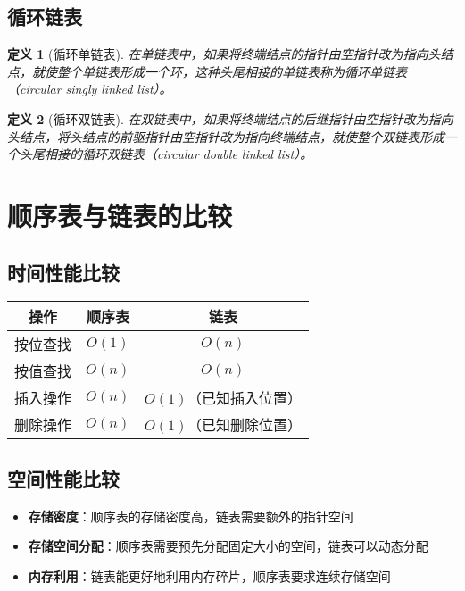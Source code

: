\documentclass[12pt,a4paper]{amsart}
\newtheorem{definition}{定义}[section]
\begin{document}
\subsection{循环链表}

\begin{definition}[循环单链表]
在单链表中，如果将终端结点的指针由空指针改为指向头结点，就使整个单链表形成一个环，这种头尾相接的单链表称为循环单链表（circular singly linked list）。
\end{definition}

\begin{definition}[循环双链表]
在双链表中，如果将终端结点的后继指针由空指针改为指向头结点，将头结点的前驱指针由空指针改为指向终端结点，就使整个双链表形成一个头尾相接的循环双链表（circular double linked list）。
\end{definition}

\section{顺序表与链表的比较}

\subsection{时间性能比较}

\begin{center}
\begin{tabular}{|c|c|c|}
\hline
\textbf{操作} & \textbf{顺序表} & \textbf{链表} \\
\hline
按位查找 & $O(1)$ & $O(n)$ \\
\hline
按值查找 & $O(n)$ & $O(n)$ \\
\hline
插入操作 & $O(n)$ & $O(1)$（已知插入位置） \\
\hline
删除操作 & $O(n)$ & $O(1)$（已知删除位置） \\
\hline
\end{tabular}
\end{center}

\subsection{空间性能比较}

\begin{itemize}
\item \textbf{存储密度}：顺序表的存储密度高，链表需要额外的指针空间
\item \textbf{存储空间分配}：顺序表需要预先分配固定大小的空间，链表可以动态分配
\item \textbf{内存利用}：链表能更好地利用内存碎片，顺序表要求连续存储空间
\end{itemize}
\end{document}
